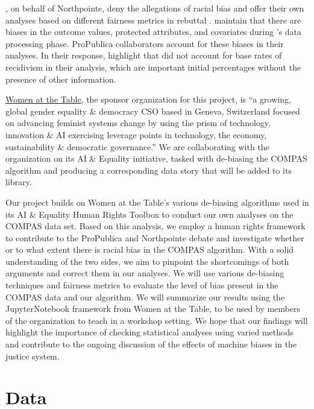 \documentclass[water,article,submit,moreauthors,pdftex]{mdpi}
\begin{document}
\citet{equivant_response_2016}, on behalf of Northpointe, deny the
allegations of racial bias and offer their own analyses based on
different fairness metrics in rebuttal \citep{equivant_response_2016}.
\citet{angwin2016machine} maintain that there are biases in the outcome
values, protected attributes, and covariates during
\citet{equivant_response_2016}'s data processing phase. ProPublica
collaborators \citet{larson2016we} account for these biases in their
analyses. In their response, \citet{equivant_response_2016} highlight
that \citet{angwin2016machine} did not account for base rates of
recidivism in their analysis, which are important initial percentages
without the presence of other information.

\href{https://www.womenatthetable.net/}{Women at the Table}, the sponsor
organization for this project, is ``a growing, global gender equality \&
democracy CSO based in Geneva, Switzerland focused on advancing feminist
systems change by using the prism of technology, innovation \& AI
exercising leverage points in technology, the economy, sustainability \&
democratic governance.'' We are collaborating with the organization on
its AI \& Equality \citep{noauthor_ai_nodate} initiative, tasked with
de-biasing the COMPAS algorithm \citep{aif360-oct-2018} and producing a
corresponding data story that will be added to its library.

Our project builds on Women at the Table's various de-biasing algorithms
used in its AI \& Equality Human Rights Toolbox to conduct our own
analyses on the COMPAS data set. Based on this analysis, we employ a
human rights framework to contribute to the ProPublica and Northpointe
debate and investigate whether or to what extent there is racial bias in
the COMPAS algorithm. With a solid understanding of the two sides, we
aim to pinpoint the shortcomings of both arguments and correct them in
our analyses. We will use various de-biasing techniques and fairness
metrics to evaluate the level of bias present in the COMPAS data and our
algorithm. We will summarize our results using the JupyterNotebook
framework from Women at the Table, to be used by members of the
organization to teach in a workshop setting. We hope that our findings
will highlight the importance of checking statistical analyses using
varied methods and contribute to the ongoing discussion of the effects
of machine biases in the justice system.

\hypertarget{data}{%
\section{Data}\label{data}}
\end{document}
